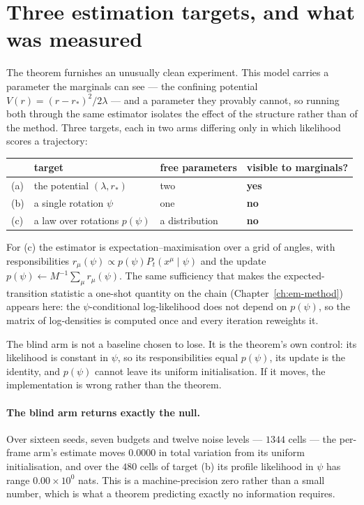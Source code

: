 \section{Three estimation targets, and what was measured}\label{sec:ring-estimation}

The theorem furnishes an unusually clean experiment. This model carries a
parameter the marginals can see --- the confining potential
$V(r) = (r-r_*)^2/2\lambda$ --- and a parameter they provably cannot, so
running both through the same estimator isolates the effect of the structure
rather than of the method. Three targets, each in two arms differing only in
which likelihood scores a trajectory:

\begin{center}\small
\begin{tabular}{@{}llll@{}}
\toprule
 & target & free parameters & visible to marginals? \\
\midrule
(a) & the potential $(\lambda, r_*)$ & two & \textbf{yes} \\
(b) & a single rotation $\psi$ & one & \textbf{no} \\
(c) & a law over rotations $p(\psi)$ & a distribution & \textbf{no} \\
\bottomrule
\end{tabular}
\end{center}

For (c) the estimator is expectation--maximisation over a grid of angles, with
responsibilities $r_\mu(\psi)\propto p(\psi)P_t(x^\mu\mid\psi)$ and the
update $p(\psi)\leftarrow M^{-1}\sum_\mu r_\mu(\psi)$. The same sufficiency
that makes the expected-transition statistic a one-shot quantity on the chain
(Chapter~\ref{ch:em-method}) appears here: the $\psi$-conditional
log-likelihood does not depend on $p(\psi)$, so the matrix of log-densities is
computed once and every iteration reweights it.

The blind arm is not a baseline chosen to lose. It is the theorem's own
control: its likelihood is constant in $\psi$, so its responsibilities equal
$p(\psi)$, its update is the identity, and $p(\psi)$ cannot leave its uniform
initialisation. If it moves, the implementation is wrong rather than the
theorem.

\paragraph{The blind arm returns exactly the null.} Over sixteen seeds, seven
budgets and twelve noise levels --- $1344$ cells --- the per-frame arm's
estimate moves $0.0000$ in total variation from its uniform initialisation,
and over the $480$ cells of target (b) its profile likelihood in $\psi$ has
range $0.00\times10^{0}$ nats. This is a machine-precision zero rather than a
small number, which is what a theorem predicting exactly no information
requires.

